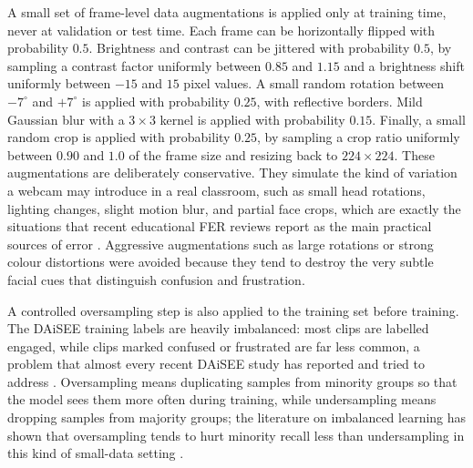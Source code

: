 A small set of frame-level data augmentations is applied only at training time, never at validation or test time. Each frame can be horizontally flipped with probability $0.5$. Brightness and contrast can be jittered with probability $0.5$, by sampling a contrast factor uniformly between $0.85$ and $1.15$ and a brightness shift uniformly between $-15$ and $15$ pixel values. A small random rotation between $-7^{\circ}$ and $+7^{\circ}$ is applied with probability $0.25$, with reflective borders. Mild Gaussian blur with a $3 \times 3$ kernel is applied with probability $0.15$. Finally, a small random crop is applied with probability $0.25$, by sampling a crop ratio uniformly between $0.90$ and $1.0$ of the frame size and resizing back to $224 \times 224$. These augmentations are deliberately conservative. They simulate the kind of variation a webcam may introduce in a real classroom, such as small head rotations, lighting changes, slight motion blur, and partial face crops, which are exactly the situations that recent educational FER reviews report as the main practical sources of error \cite{lek_academic_2023,florestiyanto_emotion_2024,vistorte_integrating_2024}. Aggressive augmentations such as large rotations or strong colour distortions were avoided because they tend to destroy the very subtle facial cues that distinguish confusion and frustration.

A controlled oversampling step is also applied to the training set before training. The DAiSEE training labels are heavily imbalanced: most clips are labelled engaged, while clips marked confused or frustrated are far less common, a problem that almost every recent DAiSEE study has reported and tried to address \cite{gupta_daisee_2016,abedi_improving_2021,mehta_three-dimensional_2022,santoni_convolutional_2023,rianto_engagement_2025}. Oversampling means duplicating samples from minority groups so that the model sees them more often during training, while undersampling means dropping samples from majority groups; the literature on imbalanced learning has shown that oversampling tends to hurt minority recall less than undersampling in this kind of small-data setting \cite{santoni_convolutional_2023}.

